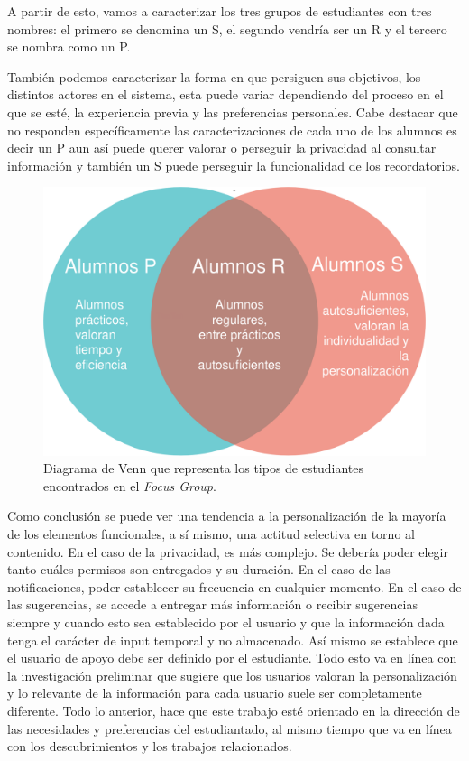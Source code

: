     \par A partir de esto, vamos a caracterizar los tres grupos de estudiantes con tres nombres: el primero se denomina un \acrfull{S}, el segundo vendría ser un \acrfull{R} y el tercero se nombra como un \acrfull{P}.
    \par También podemos caracterizar la forma en que persiguen sus objetivos, los distintos actores en el sistema, esta puede variar dependiendo del proceso en el que se esté, la experiencia previa y las preferencias personales. Cabe destacar que no responden específicamente las caracterizaciones de cada uno de los alumnos es decir un \acrshort{P} aun así puede querer valorar o perseguir la privacidad al consultar información y también un \acrshort{S} puede perseguir la funcionalidad de los recordatorios.
    \begin{figure}[h]
        \centering
        \includegraphics[scale=0.2]{media/imagenes/focus_groups/Tipos_de_alumnos-Diagrama_de_Venn.png}
        \caption[Diagrama Tipos de alumnos]{Diagrama de Venn que representa los tipos de estudiantes encontrados en el \textit{Focus Group}.}
        \label{fig:alumnosVenn}
    \end{figure}
    \par Como conclusión se puede ver una tendencia a la personalización de la mayoría de los elementos funcionales, a sí mismo, una actitud selectiva en torno al contenido. En el caso de la privacidad, es más complejo. Se debería poder elegir tanto cuáles permisos son entregados y su duración. En el caso de las notificaciones, poder establecer su frecuencia en cualquier momento. En el caso de las sugerencias, se accede a entregar más información o recibir sugerencias siempre y cuando esto sea establecido por el usuario y que la información dada tenga el carácter de input temporal y no almacenado. Así mismo se establece que el usuario de apoyo debe ser definido por el estudiante. Todo esto va en línea con la investigación preliminar que sugiere que los usuarios valoran la personalización y lo relevante de la información para cada usuario suele ser completamente diferente. Todo lo anterior, hace que este trabajo esté orientado en la dirección de las necesidades y preferencias del estudiantado, al mismo tiempo que va en línea con los descubrimientos y los trabajos relacionados.

